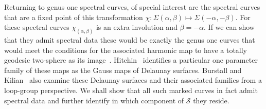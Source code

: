 \documentclass{article}
\begin{document}

Returning to genus one spectral curves, of special interest are the spectral curves that are a fixed point of this transformation $\chi: \Sigma(\alpha,\beta) \mapsto \Sigma(-\alpha,-\beta)$. For these spectral curves $\chi_{(\alpha,\beta)}$ is an extra involution and $\beta=-\alpha$. If we can show that they admit spectral data these would be exactly the genus one curves that would meet the conditions for the associated harmonic map to have a totally geodesic two-sphere as its image~\cite[Theorem~8.20]{Hitchin1990}. Hitchin~\cite[p693]{Hitchin1990} identifies a particular one parameter family of these maps as the Gauss maps of Delaunay surfaces. Burstall and Kilian~\cite{Burstall2006a} also examine these Delaunay surfaces and their associated families from a loop-group perspective. We shall show that all such marked curves in fact admit spectral data and further identify in which component of $\mathcal{S}$ they reside.
\end{document}
